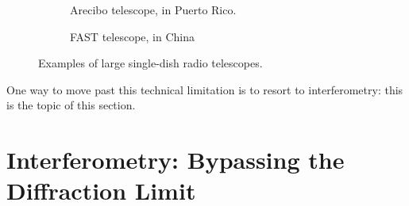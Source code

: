 \begin{figure}[ht]
\centering
\begin{subfigure}{.48\textwidth}
\caption{\label{fig.arecibo} Arecibo telescope, in Puerto Rico.}
\end{subfigure}
\hfill
\begin{subfigure}{.48\textwidth}
\caption{\label{fig.FAST} FAST telescope, in China}
\end{subfigure}
\caption{\label{fig.singleDishes} Examples of large single-dish radio telescopes.}
\end{figure}

\pg
One way to move past this technical limitation is to resort to interferometry: this is the topic of this section.





\section{Interferometry: Bypassing the Diffraction Limit}

